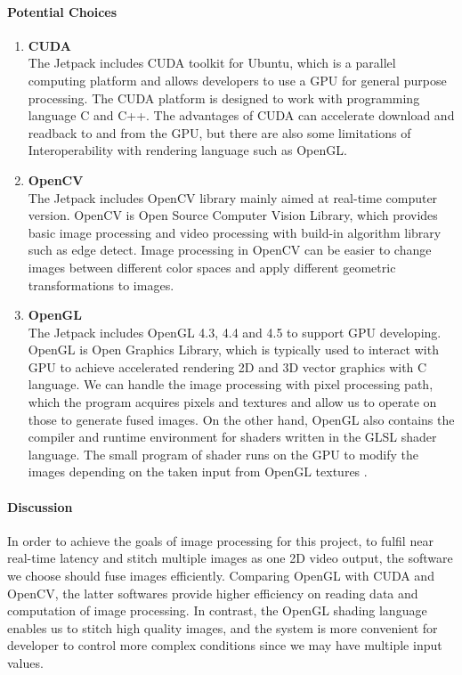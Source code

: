\paragraph{Potential Choices}
\begin{enumerate}
\item\textbf{CUDA}\\
The Jetpack includes CUDA toolkit for Ubuntu, which is a parallel computing platform and 
allows developers to use a GPU for general purpose processing. The CUDA platform is designed 
to work with programming language C and C++. The advantages of CUDA can accelerate download 
and readback to and from the GPU, but there are also some limitations of Interoperability 
with rendering language such as OpenGL.\\

\item\textbf{OpenCV}\\
The Jetpack includes OpenCV library mainly aimed at real-time computer version. OpenCV is 
Open Source Computer Vision Library, which provides basic image processing and video 
processing with build-in algorithm library such as edge detect. Image processing in OpenCV 
can be easier to change images between different color spaces and apply different geometric 
transformations to images.\\

\item\textbf{OpenGL}\\
The Jetpack includes OpenGL 4.3, 4.4 and 4.5 to support GPU developing. OpenGL is Open Graphics Library, 
which is typically used to interact with GPU to achieve accelerated rendering 2D and 3D vector graphics 
with C language. We can handle the image processing with pixel processing path, which the program 
acquires pixels and textures and allow us to operate on those to generate fused images. On the other 
hand, OpenGL also contains the compiler and runtime environment for shaders written in the GLSL shader 
language. The small program of shader runs on the GPU to modify the images depending on the taken input 
from OpenGL textures \cite{shader}.\\ 
\end{enumerate}

\paragraph{Discussion}
In order to achieve the goals of image processing for this project, to fulfil near real-time latency and 
stitch multiple images as one 2D video output, the software we choose should fuse images efficiently. 
Comparing OpenGL with CUDA and OpenCV, the latter softwares provide higher efficiency on reading data and 
computation of image processing. In contrast, the OpenGL shading language enables us to stitch high 
quality images, and the system is more convenient for developer to control more complex conditions since 
we may have multiple input values.\\


